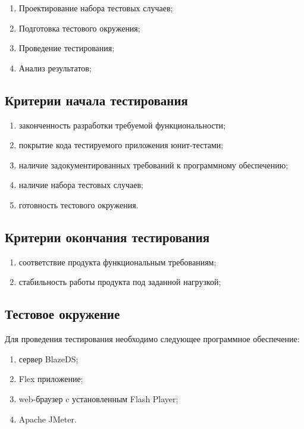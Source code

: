 \begin{enumerate}
\item Проектирование набора тестовых случаев;
\item Подготовка тестового окружения;
\item Проведение тестирования;
\item Анализ результатов;
\end{enumerate}

\subsection{Критерии начала тестирования}

\begin{enumerate}
\item законченность разработки требуемой функциональности;
\item покрытие кода тестируемого приложения юнит-тестами;
\item наличие задокументированных требований к программному обеспечению;
\item наличие набора тестовых случаев;
\item готовность тестового окружения.
\end{enumerate}

\subsection{Критерии окончания тестирования}

\begin{enumerate}
\item соответствие продукта функциональным требованиям;
\item стабильность работы продукта под заданной нагрузкой;
\end{enumerate}

\subsection{Тестовое окружение}

Для проведения тестирования необходимо следующее программное обеспечение:

\begin{enumerate}
\item сервер BlazeDS;
\item Flex приложение;
\item web-браузер c установленным Flash Player;
\item Apache JMeter.
\end{enumerate}

